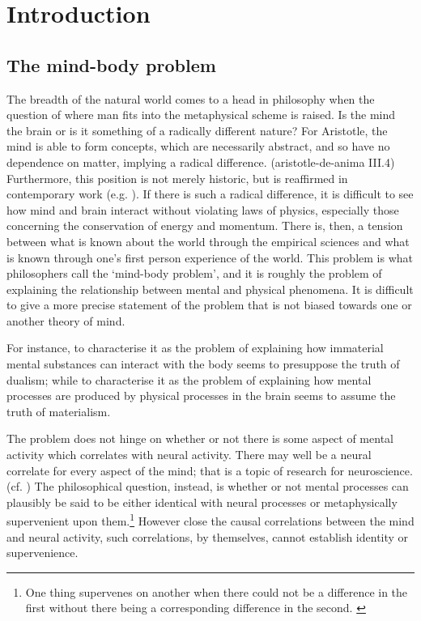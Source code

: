 \chapter{Introduction}
\label{ch:chapter1}


\section{The mind-body problem}

The breadth of the natural world comes to a head in philosophy when the question of where man fits into the metaphysical scheme is raised. Is the mind the brain or is it something of a radically different nature? For Aristotle, the mind is able to form concepts, which are necessarily abstract, and so have no dependence on matter, implying a radical difference. (\acrshort{aristotle-de-anima} III.4) Furthermore, this position is not merely historic, but is reaffirmed in contemporary work (e.g. \cite[][250--55]{Oderberg2007-ODERE-2}).
If there is such a radical difference, it is difficult to see how mind and brain interact without violating laws of physics, especially those concerning the conservation of energy and momentum.
There is, then, a tension between what is known about the world through the empirical sciences and what is known through one's first person experience of the world.
This problem is what philosophers call the `mind-body problem', and it is roughly the problem of explaining the relationship between mental and physical phenomena. It is difficult to give a more precise statement of the problem that is not biased towards one or another theory of mind.
\begin{quoting}
For instance, to characterise it as the problem of explaining how immaterial mental substances can interact with the body seems to presuppose the truth of dualism; while to characterise it as the problem of explaining how mental processes are produced by physical processes in the brain seems to assume the truth of materialism.
\parencite[][250]{feser2006philosophy}
\end{quoting}

The problem does not hinge on whether or not there is some aspect of mental activity which correlates with neural activity. There may well be a neural correlate for every aspect of the mind; that is a topic of research for neuroscience. (cf. \cite[][]{Kim1966-KIMOTP}) The philosophical question, instead, is whether or not mental processes can plausibly be said to be either identical with neural processes or metaphysically supervenient upon them.\footnote{One thing supervenes on another when there could not be a difference in the first without there being a corresponding difference in the second. \parencite[][]{Haugeland1982-HAUWS}}
However close the causal correlations between the mind and neural activity, such correlations, by themselves, cannot establish identity or supervenience.

